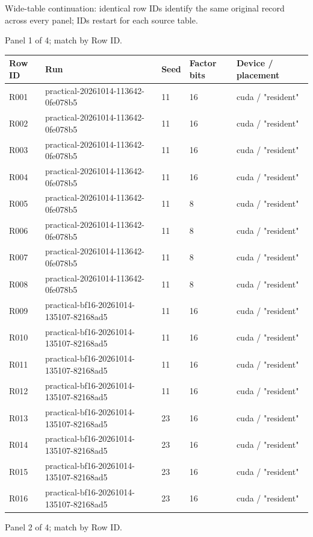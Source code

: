 \documentclass[10pt]{article}
\begin{document}
Wide-table continuation: identical row IDs identify the same original record across every panel; IDs restart for each source table.
\par\noindent Panel 1 of 4; match by Row ID.
{\scriptsize\setlength{\tabcolsep}{2pt}
\begin{longtable}{p{}p{}p{}p{}p{}}
Row ID & Run & Seed & Factor bits & Device / placement \\
\hline\endhead
R001 & practical-20261014-113642-0fe078b5 & 11 & 16 & cuda / "resident" \\
R002 & practical-20261014-113642-0fe078b5 & 11 & 16 & cuda / "resident" \\
R003 & practical-20261014-113642-0fe078b5 & 11 & 16 & cuda / "resident" \\
R004 & practical-20261014-113642-0fe078b5 & 11 & 16 & cuda / "resident" \\
R005 & practical-20261014-113642-0fe078b5 & 11 & 8 & cuda / "resident" \\
R006 & practical-20261014-113642-0fe078b5 & 11 & 8 & cuda / "resident" \\
R007 & practical-20261014-113642-0fe078b5 & 11 & 8 & cuda / "resident" \\
R008 & practical-20261014-113642-0fe078b5 & 11 & 8 & cuda / "resident" \\
R009 & practical-bf16-20261014-135107-82168ad5 & 11 & 16 & cuda / "resident" \\
R010 & practical-bf16-20261014-135107-82168ad5 & 11 & 16 & cuda / "resident" \\
R011 & practical-bf16-20261014-135107-82168ad5 & 11 & 16 & cuda / "resident" \\
R012 & practical-bf16-20261014-135107-82168ad5 & 11 & 16 & cuda / "resident" \\
R013 & practical-bf16-20261014-135107-82168ad5 & 23 & 16 & cuda / "resident" \\
R014 & practical-bf16-20261014-135107-82168ad5 & 23 & 16 & cuda / "resident" \\
R015 & practical-bf16-20261014-135107-82168ad5 & 23 & 16 & cuda / "resident" \\
R016 & practical-bf16-20261014-135107-82168ad5 & 23 & 16 & cuda / "resident" \\
\end{longtable}}
\par\noindent Panel 2 of 4; match by Row ID.
\end{document}
